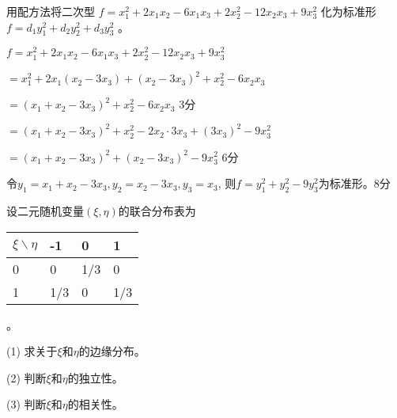 \documentclass[noanswer]{USTBExam}
\begin{document}
\begin{problem}
  用配方法将二次型 $f = x_1^2 + 2 x_1 x_2 - 6 x_1 x_3 + 2 x_2^2 - 12
    x_2 x_3 + 9 x^2_3$ 化为标准形 $f = d_1 y^2_1 + d_2 y^2_2 + d_3 y^2_3$ 。
\end{problem}

\bigskip

\begin{solution}
  $f = x_1^2 + 2 x_1 x_2 - 6 x_1 x_3 + 2 x_2^2 - 12 x_2 x_3 + 9 x^2_3$ \par
  \qquad\qquad$= x_1^2 + 2 x_1 (x_2 - 3 x_3) + (x_2 - 3 x_3)^2 + x_2^2 - 6 x_2 x_3 $ \par
  \qquad\qquad$= (x_1 + x_2 - 3 x_3)^2 + x_2^2 - 6 x_2 x_3$ \dotfill 3分 \par
  \qquad\qquad$= (x_1 + x_2 - 3 x_3)^2 + x_2^2 - 2 x_2 \cdot 3 x_3 + (3 x_3)^2 - 9x_3^2$ \par
  \qquad\qquad$= (x_1 + x_2 - 3 x_3)^2 + (x_2 - 3 x_3)^2 - 9 x_3^2$ \dotfill 6分\par
  令$y_1 = x_1 + x_2 - 3 x_3, y_2 = x_2 - 3 x_3, y_3 = x_3$, \newline
  则$f = y_1^2 + y_2^2 - 9y_3^2$为标准形。\dotfill 8分
\end{solution}



\begin{problem}
  设二元随机变量$(\xi, \eta)$的联合分布表为
  \begin{tabular}{|l|l|l|l|}
    \hline
    $\xi \backslash \eta$ & -1  & 0   & 1   \\
    \hline
    0                     & 0   & 1/3 & 0   \\
    \hline
    1                     & 1/3 & 0   & 1/3 \\
    \hline
  \end{tabular}
  。\par
  (1) 求关于$\xi$和$\eta$的边缘分布。\par
  (2) 判断$\xi$和$\eta$的独立性。\par
  (3) 判断$\xi$和$\eta$的相关性。
\end{problem}

\bigskip
\end{document}
